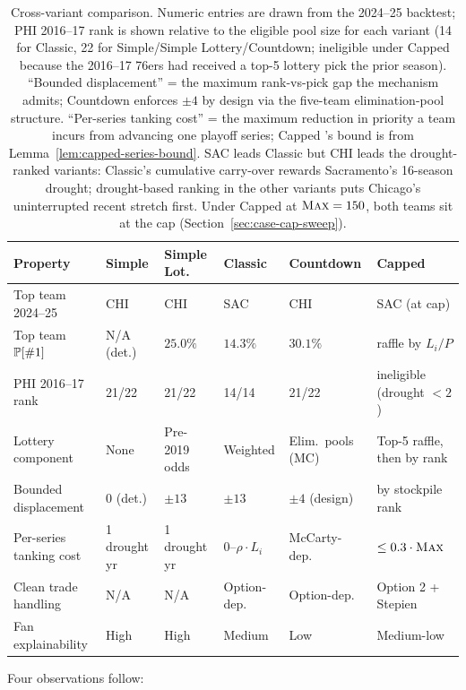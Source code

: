 \begin{table}[t]
\centering
\footnotesize
\begin{tabular}{lp{2.0cm}p{2.0cm}p{2.0cm}p{2.0cm}p{2.4cm}}
\toprule
Property & Simple & Simple Lot. & Classic & Countdown & Capped \\
\midrule
Top team 2024--25 & CHI & CHI & SAC & CHI & SAC (at cap) \\
Top team $\mathbb{P}[\#1]$ & N/A (det.) & $25.0\%$ & $14.3\%$ & $30.1\%$ & raffle by $L_i / P$ \\
PHI 2016--17 rank & 21/22 & 21/22 & 14/14 & 21/22 & ineligible (drought $<2$) \\
Lottery component & None & Pre-2019 odds & Weighted & Elim.\ pools (MC) & Top-5 raffle, then by rank \\
Bounded displacement & 0 (det.) & $\pm 13$ & $\pm 13$ & $\pm 4$ (design) & by stockpile rank \\
Per-series tanking cost & 1 drought yr & 1 drought yr & 0--$\rho \cdot L_i$ & McCarty-dep. & $\leq 0.3 \cdot \textup{\textsc{Max}}$ \\
Clean trade handling & N/A & N/A & Option-dep. & Option-dep. & Option 2 + Stepien \\
Fan explainability & High & High & Medium & Low & Medium-low \\
\bottomrule
\end{tabular}
\caption{Cross-variant comparison. Numeric entries are drawn from the 2024--25 backtest; PHI 2016--17 rank is shown relative to the eligible pool size for each variant (14 for Classic, 22 for Simple/Simple Lottery/Countdown; ineligible under Capped \cola{} because the 2016--17 76ers had received a top-5 lottery pick the prior season). ``Bounded displacement'' = the maximum rank-vs-pick gap the mechanism admits; Countdown \cola{} enforces $\pm 4$ by design via the five-team elimination-pool structure. ``Per-series tanking cost'' = the maximum reduction in priority a team incurs from advancing one playoff series; Capped \cola{}'s bound is from Lemma~\ref{lem:capped-series-bound}. SAC leads Classic \cola{} but CHI leads the drought-ranked variants: Classic's cumulative carry-over rewards Sacramento's 16-season drought; drought-based ranking in the other variants puts Chicago's uninterrupted recent stretch first. Under Capped \cola{} at $\textup{\textsc{Max}} = 150$, both teams sit at the cap (Section~\ref{sec:case-cap-sweep}).}
\label{tab:cross-variant}
\end{table}

Four observations follow:

